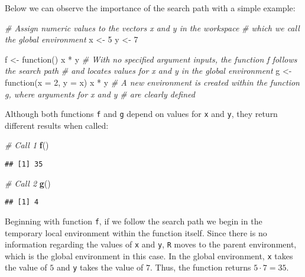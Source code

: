 \documentclass[11,]{article}
\newenvironment{Shaded}{\begin{snugshade}}{\end{snugshade}}
\newcommand{\KeywordTok}[1]{\textcolor[rgb]{0.13,0.29,0.53}{\textbf{{#1}}}}
\newcommand{\DataTypeTok}[1]{\textcolor[rgb]{0.13,0.29,0.53}{{#1}}}
\newcommand{\DecValTok}[1]{\textcolor[rgb]{0.00,0.00,0.81}{{#1}}}
\newcommand{\StringTok}[1]{\textcolor[rgb]{0.31,0.60,0.02}{{#1}}}
\newcommand{\CommentTok}[1]{\textcolor[rgb]{0.56,0.35,0.01}{\textit{{#1}}}}
\newcommand{\NormalTok}[1]{{#1}}
\begin{document}
Below we can observe the importance of the search path with a simple
example:

\begin{Shaded}
\begin{Highlighting}[]
\CommentTok{# Assign numeric values to the vectors x and y in the workspace }
\CommentTok{# which we call the global environment}
\NormalTok{x <-}\StringTok{ }\DecValTok{5}
\NormalTok{y <-}\StringTok{ }\DecValTok{7}

\NormalTok{f <-}\StringTok{ }\NormalTok{function() x *}\StringTok{ }\NormalTok{y}
  \CommentTok{# With no specified argument inputs, the function f follows the search path}
  \CommentTok{# and locates values for x and y in the global environment}
\NormalTok{g <-}\StringTok{ }\NormalTok{function(}\DataTypeTok{x =} \DecValTok{2}\NormalTok{, }\DataTypeTok{y =} \NormalTok{x) x *}\StringTok{ }\NormalTok{y}
  \CommentTok{# A new environment is created within the function g, where arguments for x and y}
  \CommentTok{# are clearly defined}
\end{Highlighting}
\end{Shaded}

Although both functions \texttt{f} and \texttt{g} depend on values for
\texttt{x} and \texttt{y}, they return different results when called:

\begin{Shaded}
\begin{Highlighting}[]
\CommentTok{# Call 1}
\KeywordTok{f}\NormalTok{()}
\end{Highlighting}
\end{Shaded}

\begin{verbatim}
## [1] 35
\end{verbatim}

\begin{Shaded}
\begin{Highlighting}[]
\CommentTok{# Call 2}
\KeywordTok{g}\NormalTok{()}
\end{Highlighting}
\end{Shaded}

\begin{verbatim}
## [1] 4
\end{verbatim}

Beginning with function \texttt{f}, if we follow the search path we
begin in the temporary local environment within the function itself.
Since there is no information regarding the values of \texttt{x} and
\texttt{y}, \texttt{R} moves to the parent environment, which is the
global environment in this case. In the global environment, \texttt{x}
takes the value of \(5\) and \texttt{y} takes the value of \(7\). Thus,
the function returns \(5 \cdot 7=35\).
\end{document}
